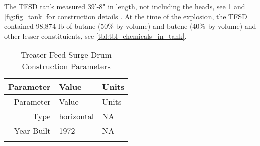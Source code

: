 \documentclass[10pt,parskip=half,
toc=sectionentrywithdots,
bibliography=totocnumbered,
captions=tableheading,numbers=noendperiod]{scrartcl}
\begin{document}
The TFSD tank measured 39'-8" in length, not including the heads, see
\cref{tbl:tbl_tank} and \cref{fig:fig_tank} for construction details
\cite{PES2019}. At the time of the explosion, the TFSD contained 98,874
lb of butane (50\% by volume) and butene (40\% by volume) and other
lesser constituients, see \cref{tbl:tbl_chemicals_in_tank}.

\begin{longtable}[]{@{}rll@{}}
\caption{Treater-Feed-Surge-Drum Construction Parameters \cite{PES2019}
\label{tbl:tbl_tank}}\tabularnewline
\toprule
\begin{minipage}[b]{0.23\columnwidth}\raggedleft
Parameter\strut
\end{minipage} & \begin{minipage}[b]{0.23\columnwidth}\raggedright
Value\strut
\end{minipage} & \begin{minipage}[b]{0.23\columnwidth}\raggedright
Units\strut
\end{minipage}\tabularnewline
\midrule
\endfirsthead
\toprule
\begin{minipage}[b]{0.23\columnwidth}\raggedleft
Parameter\strut
\end{minipage} & \begin{minipage}[b]{0.23\columnwidth}\raggedright
Value\strut
\end{minipage} & \begin{minipage}[b]{0.23\columnwidth}\raggedright
Units\strut
\end{minipage}\tabularnewline
\midrule
\endhead
\begin{minipage}[t]{0.23\columnwidth}\raggedleft
Type\strut
\end{minipage} & \begin{minipage}[t]{0.23\columnwidth}\raggedright
horizontal\strut
\end{minipage} & \begin{minipage}[t]{0.23\columnwidth}\raggedright
NA\strut
\end{minipage}\tabularnewline
\begin{minipage}[t]{0.23\columnwidth}\raggedleft
Year Built\strut
\end{minipage} & \begin{minipage}[t]{0.23\columnwidth}\raggedright
1972\strut
\end{minipage} & \begin{minipage}[t]{0.23\columnwidth}\raggedright
NA\strut
\end{minipage}\tabularnewline
\begin{minipage}[t]{0.23\columnwidth}\raggedleft

\end{minipage}
\end{longtable}
\end{document}
